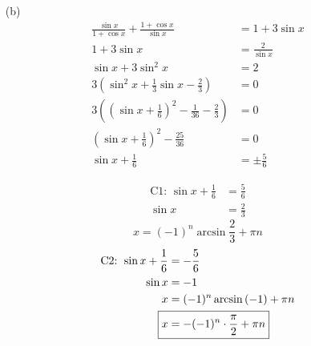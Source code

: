 \documentclass{article}
\begin{document}
\begin{itemize}
\item[(b)]
	\begin{align*}
		\frac{\sin x}{1+\cos x}+\frac{1+\cos x}{\sin x}&=1+3\sin x \\
		1+3\sin x&=\frac{2}{\sin x} \\
		\sin x+3\sin^2 x&=2 \\
		3\left(\sin^2x+\frac{1}{3}\sin x-\frac{2}{3}\right)&=0 \\
		3\left(\left(\sin x+\frac{1}{6}\right)^2-\frac{1}{36}-
			\frac{2}{3}\right)&=0 \\
		\left(\sin x+\frac{1}{6}\right)^2-\frac{25}{36}&=0 \\
		\sin x+\frac{1}{6}&=\pm\frac{5}{6}
	\end{align*}
	\begin{vwcol}[widths={0.5,0.5},rule=0pt]
		\begin{align*}
			\text{C1: }\sin x+\frac{1}{6}&=\frac{5}{6} \\
			\sin x&=\frac{2}{3}
		\end{align*}
		\[
			\boxed{x=(-1)^{n}\arcsin\frac{2}{3}+\pi n}
		\]
		\vfill\null\pagebreak
		\begin{align*}
			\text{C2: }\sin x+\frac{1}{6}&=-\frac{5}{6} \\
			\sin x&=-1 \\
			x&=(-1)^{n}\arcsin\left(-1\right)+\pi n \\
			\Aboxed{x&=-(-1)^{n}\cdot\frac{\pi}{2}+\pi n}
		\end{align*}
	\end{vwcol}
\end{itemize}
\end{document}
